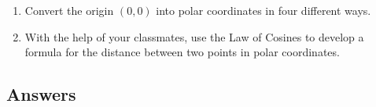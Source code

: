 \documentclass{ximera}
\begin{document}
\begin{enumerate}

\setcounter{enumi}{\value{HW}}

\item Convert the origin $(0,0)$ into polar coordinates in four different ways.

\item With the help of your classmates, use the Law of Cosines to develop a formula for the distance between two points in polar coordinates.

\setcounter{HW}{\value{enumi}}

\end{enumerate}

\newpage

\subsection{Answers}
\end{document}
